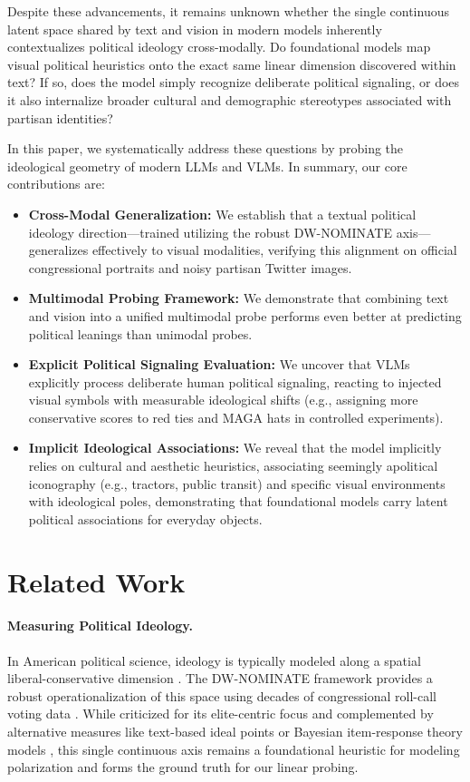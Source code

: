 \documentclass{article}
\begin{document}
Despite these advancements, it remains unknown whether the single continuous latent space shared by text and vision in modern models inherently contextualizes political ideology cross-modally. Do foundational models map visual political heuristics onto the exact same linear dimension discovered within text? If so, does the model simply recognize deliberate political signaling, or does it also internalize broader cultural and demographic stereotypes associated with partisan identities?

In this paper, we systematically address these questions by probing the ideological geometry of modern LLMs and VLMs. In summary, our core contributions are:
\begin{itemize}
    \item \textbf{Cross-Modal Generalization:} We establish that a textual political ideology direction---trained utilizing the robust DW-NOMINATE axis---generalizes effectively to visual modalities, verifying this alignment on official congressional portraits and noisy partisan Twitter images.
    \item \textbf{Multimodal Probing Framework:} We demonstrate that combining text and vision into a unified multimodal probe performs even better at predicting political leanings than unimodal probes.
    \item \textbf{Explicit Political Signaling Evaluation:} We uncover that VLMs explicitly process deliberate human political signaling, reacting to injected visual symbols with measurable ideological shifts (e.g., assigning more conservative scores to red ties and MAGA hats in controlled experiments).
    \item \textbf{Implicit Ideological Associations:} We reveal that the model implicitly relies on cultural and aesthetic heuristics, associating seemingly apolitical iconography (e.g., tractors, public transit) and specific visual environments with ideological poles, demonstrating that foundational models carry latent political associations for everyday objects.
\end{itemize}

\section{Related Work}

\paragraph{Measuring Political Ideology.} In American political science, ideology is typically modeled along a spatial liberal-conservative dimension \citep{pooleSpatialModelsParliamentary2005}. The DW-NOMINATE framework provides a robust operationalization of this space using decades of congressional roll-call voting data \citep{carrollMeasuringBiasUncertainty2009, mccartyDefenseDWNOMINATE2016}. While criticized for its elite-centric focus and complemented by alternative measures like text-based ideal points \citep{vafaTextBasedIdealPoints2020} or Bayesian item-response theory models \citep{caugheyDynamicEstimationLatent2015}, this single continuous axis remains a foundational heuristic for modeling polarization and forms the ground truth for our linear probing.
\end{document}
